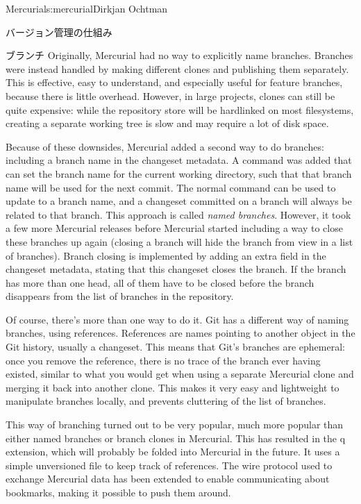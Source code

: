 \begin{aosachapter}{Mercurial}{s:mercurial}{Dirkjan Ochtman}
\begin{aosasect1}{バージョン管理の仕組み}
\begin{aosasect2}{ブランチ}
Originally, Mercurial had no way to explicitly name branches. Branches
were instead handled by making different clones and publishing them
separately. This is effective, easy to understand, and especially
useful for feature branches, because there is little
overhead. However, in large projects, clones can still be quite
expensive: while the repository store will be hardlinked on most
filesystems, creating a separate working tree is slow and may require
a lot of disk space.

Because of these downsides, Mercurial added a second way to do
branches: including a branch name in the changeset metadata. A
 command was added that can set the branch name for the
current working directory, such that that branch name will be used for
the next commit. The normal  command can be used to
update to a branch name, and a changeset committed on a branch will
always be related to that branch. This approach is called \emph{named
branches}. However, it took a few more Mercurial releases before
Mercurial started including a way to close these branches up
again (closing a branch will hide the branch from view in a list of
branches). Branch closing is implemented by adding an extra field in the changeset
metadata, stating that this changeset closes the branch. If the branch
has more than one head, all of them have to be closed before the
branch disappears from the list of branches in the repository.

Of course, there's more than one way to do it.
Git has a different way of naming branches, using
references. References are names pointing to another object in the
Git history, usually a changeset. This means that Git's branches are
ephemeral: once you remove the reference, there is no trace of the
branch ever having existed, similar to what you would get when using a
separate Mercurial clone and merging it back into another clone. This
makes it very easy and lightweight to manipulate branches locally, and
prevents cluttering of the list of branches.

This way of branching turned out to be very popular, much more popular
than either named branches or branch clones in Mercurial. This has
resulted in the q extension, which will probably be
folded into Mercurial in the future. It uses a simple unversioned file
to keep track of references. The wire protocol used to exchange
Mercurial data has been extended to enable communicating about
bookmarks, making it possible to push them around.

\end{aosasect2}


\end{aosasect1}
\end{aosachapter}
